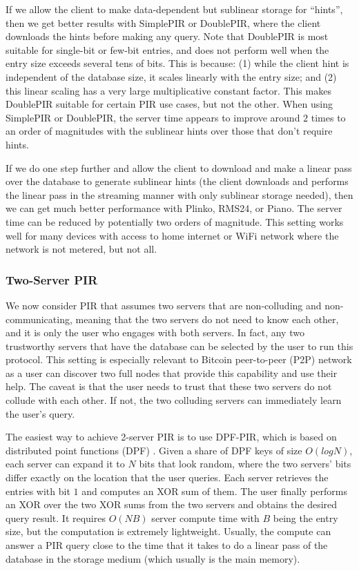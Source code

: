 If we allow the client to make data-dependent but sublinear storage for ``hints'', then we get better results with SimplePIR or DoublePIR, where the client downloads the hints before making any query. Note that DoublePIR is most suitable for single-bit or few-bit entries, and does not perform well when the entry size exceeds several tens of bits. This is because: (1) while the client hint is independent of the database size, it scales linearly with the entry size; and (2) this linear scaling has a very large multiplicative constant factor. This makes DoublePIR suitable for certain PIR use cases, but not the other. When using SimplePIR or DoublePIR, the server time appears to improve around $2$ times to an order of magnitudes with the sublinear hints over those that don't require hints.

If we do one step further and allow the client to download and make a linear pass over the database to generate sublinear hints (the client downloads and performs the linear pass in the streaming manner with only sublinear storage needed), then we can get much better performance with Plinko, RMS24, or Piano. The server time can be reduced by potentially two orders of magnitude. This setting works well for many devices with access to home internet or WiFi network where the network is not metered, but not all.

\subsubsection{Two-Server PIR}

We now consider PIR that assumes two servers that are non-colluding and non-communicating, meaning that the two servers do not need to know each other, and it is only the user who engages with both servers. In fact, any two trustworthy servers that have the database can be selected by the user to run this protocol. This setting is especially relevant to Bitcoin peer-to-peer (P2P) network as a user can discover two full nodes that provide this capability and use their help. The caveat is that the user needs to trust that these two servers do not collude with each other. If not, the two colluding servers can immediately learn the user's query.

The easiest way to achieve 2-server PIR is to use DPF-PIR, which is based on distributed point functions (DPF) \cite{gilboa2014dpf,boyle2015fss,boyle2016fss}. Given a share of DPF keys of size $O(logN)$, each server can expand it to $N$ bits that look random, where the two servers' bits differ exactly on the location that the user queries. Each server retrieves the entries with bit $1$ and computes an XOR sum of them. The user finally performs an XOR over the two XOR sums from the two servers and obtains the desired query result. It requires $O(NB)$ server compute time with $B$ being the entry size, but the computation is extremely lightweight. Usually, the compute can answer a PIR query close to the time that it takes to do a linear pass of the database in the storage medium (which usually is the main memory).

